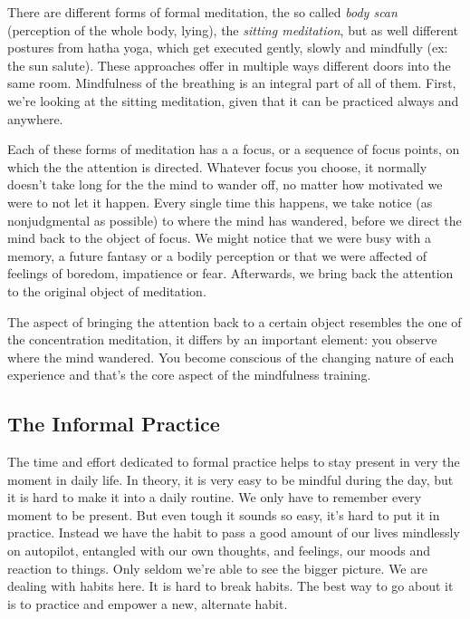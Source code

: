 \documentclass[../Book.Stress_regulation.tex]{subfiles}
\begin{document}
 There are different forms of formal meditation, the so called \emph{body scan} (perception of the whole body, lying), the \emph{sitting meditation}, but as well different postures from hatha yoga, which get executed gently, slowly and mindfully (ex: the sun salute).
These approaches offer in multiple ways different doors into the same room.
Mindfulness of the breathing is an integral part of all of them.
First, we're looking at the sitting meditation, given that it can be practiced always and anywhere.

Each of these forms of meditation has a a focus, or a sequence of focus points, on which the the attention is directed.
Whatever focus you choose, it normally doesn't take long for the the {mind to wander off}, no matter how motivated we were to not let it happen.
Every single time this happens, we {take notice} (as nonjudgmental as possible) to where the mind has wandered, before we direct the mind {back to the object of focus}.
We might notice that we were busy with a memory, a future fantasy or a bodily perception or that we were affected of feelings of boredom, impatience or fear. Afterwards, we bring back the attention to the original object of meditation.

The aspect of bringing the attention back to a certain object resembles the one of the concentration meditation, it differs by an important element: you observe where the mind wandered. You become conscious of the changing nature of each experience and that's the core aspect of the mindfulness training.

\subsection{The Informal Practice}

The time and effort dedicated to formal practice helps to {stay present} in very the moment in daily life. 
In theory, it is very easy to be mindful during the day, but it is hard to make it into a {daily routine}. We only have to remember every moment to be present. But even tough it sounds so easy, it's hard to put it in practice.
Instead we have the habit to pass a good amount of our lives mindlessly on {autopilot}, entangled with our own thoughts, and feelings, our moods and reaction to things. Only seldom we're able to see the bigger picture.
 We are dealing with {habits} here. It is hard to break habits. The best way to go about it is to practice and {empower a new, alternate habit}.
\end{document}
